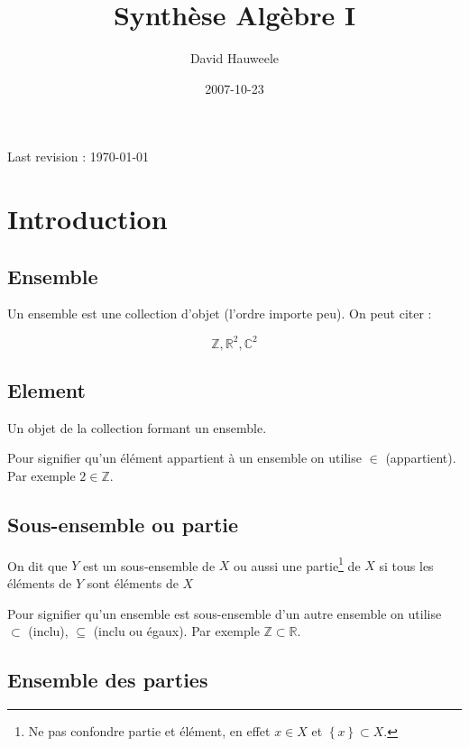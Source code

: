 \documentclass[a4paper,10pt]{article}
\author{David Hauweele}
\title{Synthèse Algèbre I}
\date{2007-10-23}
\begin{document}
\maketitle
Last revision : \today




\tableofcontents
\newpage

\section{Introduction}

\subsection{Ensemble}

Un ensemble est une collection d'objet (l'ordre importe peu). On peut citer :

$$\mathbb{Z},\mathbb{R}^2,\mathbb{C}^2$$

\subsection{Element}

Un objet de la collection formant un ensemble.

Pour signifier qu'un élément appartient à un ensemble on utilise $\in$ (appartient). Par exemple $2 \in \mathbb{Z}$.

\subsection{Sous-ensemble ou partie}

On dit que $Y$ est un sous-ensemble de $X$ ou aussi une partie\footnote{Ne pas confondre partie et élément, en effet $x\in X$ et $\left\lbrace x \right\rbrace \subset X$.} de $X$ si tous les éléments de $Y$ sont éléments de $X$

Pour signifier qu'un ensemble est sous-ensemble d'un autre ensemble on utilise $\subset$ (inclu), $\subseteq$ (inclu ou égaux). Par exemple $\mathbb{Z} \subset \mathbb{R}$.

\subsection{Ensemble des parties}
\end{document}
